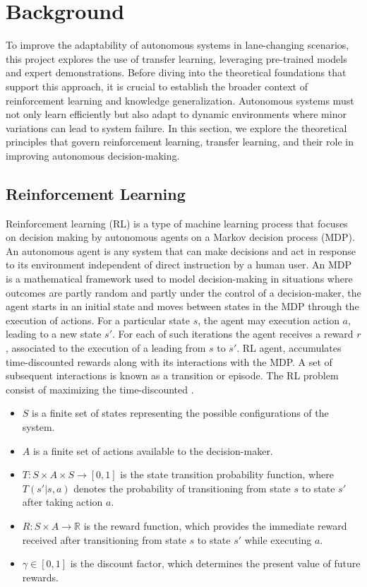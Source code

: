 
\chapter{Background}
\label{chap:background}
To improve the adaptability of autonomous systems in lane-changing scenarios, this project explores the use of transfer learning, leveraging pre-trained models and expert demonstrations. Before diving into the theoretical foundations that support this approach, it is crucial to establish the broader context of reinforcement learning and knowledge generalization. Autonomous systems must not only learn efficiently but also adapt to dynamic environments where minor variations can lead to system failure. In this section, we explore the theoretical principles that govern reinforcement learning, transfer learning, and their role in improving autonomous decision-making.

\section{Reinforcement Learning}
Reinforcement learning (RL) is a type of machine learning process that focuses on decision making by autonomous agents on a Markov decision process (MDP). An autonomous agent is any system that can make decisions and act in response to its environment independent of direct instruction by a human user. An MDP is a mathematical framework used to model decision-making in situations where outcomes are partly random and partly under the control of a decision-maker, the agent starts in an initial state and moves between states in the MDP through the execution of actions. For a particular state $s$, the agent may execution action $a$, leading to a new state $s'$. For each of such iterations the agent receives a reward $r$, associated to the execution of a leading from $s$ to $s'$. RL agent, accumulates time-discounted rewards along with its interactions with the MDP. A set of subsequent interactions is known as a transition or episode. The RL problem consist of maximizing the time-discounted \cite{Sutton2018}.

\begin{itemize}
    \item $S$ is a finite set of states representing the possible configurations of the system.
    \item $A$ is a finite set of actions available to the decision-maker.
    \item $T: S \times A \times S \rightarrow [0, 1]$ is the state transition probability function, where $T(s' | s, a)$ denotes the probability of transitioning from state $s$ to state $s'$ after taking action $a$.
    \item $R: S \times A \rightarrow \mathbb{R}$ is the reward function, which provides the immediate reward received after transitioning from state $s$ to state $s'$ while executing   $a$.
    \item $\gamma \in [0, 1]$ is the discount factor, which determines the present value of future rewards.
\end{itemize}

